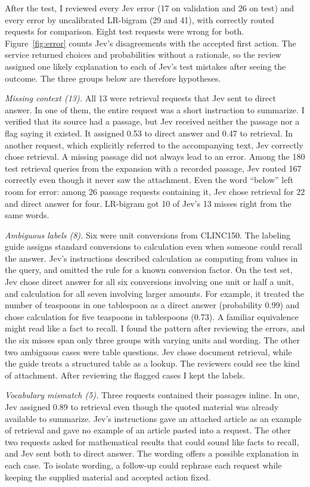 \documentclass[conference]{IEEEtran}
\begin{document}
After the test, I reviewed every Jev error (17 on validation and 26 on test) and every error by uncalibrated LR-bigram (29 and 41), with correctly routed requests for comparison. Eight test requests were wrong for both. Figure~\ref{fig:error} counts Jev's disagreements with the accepted first action. The service returned choices and probabilities without a rationale, so the review assigned one likely explanation to each of Jev's test mistakes after seeing the outcome. The three groups below are therefore hypotheses.

\emph{Missing context (13).} All 13 were retrieval requests that Jev sent to direct answer. In one of them, the entire request was a short instruction to summarize. I verified that its source had a passage, but Jev received neither the passage nor a flag saying it existed. It assigned 0.53 to direct answer and 0.47 to retrieval. In another request, which explicitly referred to the accompanying text, Jev correctly chose retrieval. A missing passage did not always lead to an error. Among the 180 test retrieval queries from the expansion with a recorded passage, Jev routed 167 correctly even though it never saw the attachment. Even the word ``below'' left room for error: among 26 passage requests containing it, Jev chose retrieval for 22 and direct answer for four. LR-bigram got 10 of Jev's 13 misses right from the same words.

\emph{Ambiguous labels (8).} Six were unit conversions from CLINC150. The labeling guide assigns standard conversions to calculation even when someone could recall the answer. Jev's instructions described calculation as computing from values in the query, and omitted the rule for a known conversion factor. On the test set, Jev chose direct answer for all six conversions involving one unit or half a unit, and calculation for all seven involving larger amounts. For example, it treated the number of teaspoons in one tablespoon as a direct answer (probability 0.99) and chose calculation for five teaspoons in tablespoons (0.73). A familiar equivalence might read like a fact to recall. I found the pattern after reviewing the errors, and the six misses span only three groups with varying units and wording. The other two ambiguous cases were table questions. Jev chose document retrieval, while the guide treats a structured table as a lookup. The reviewers could see the kind of attachment. After reviewing the flagged cases I kept the labels.

\emph{Vocabulary mismatch (5).} Three requests contained their passages inline. In one, Jev assigned 0.89 to retrieval even though the quoted material was already available to summarize. Jev's instructions gave an attached article as an example of retrieval and gave no example of an article pasted into a request. The other two requests asked for mathematical results that could sound like facts to recall, and Jev sent both to direct answer. The wording offers a possible explanation in each case. To isolate wording, a follow-up could rephrase each request while keeping the supplied material and accepted action fixed.
\end{document}
